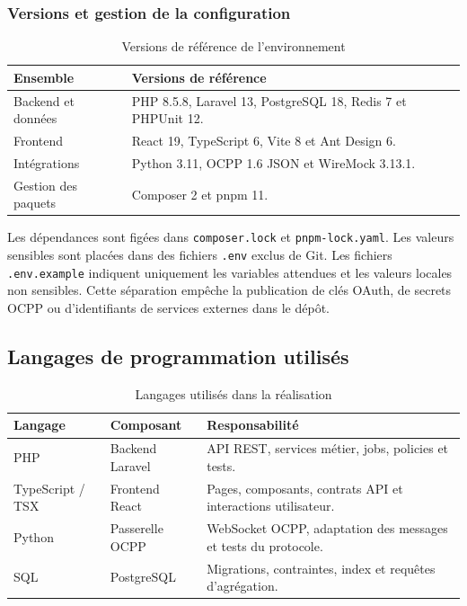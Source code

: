 \subsubsection*{Versions et gestion de la configuration}

\begin{table}[H]
  \centering
  \caption{Versions de référence de l'environnement}
  \label{tab:implementation-toolchain}
  \begin{tabularx}{\textwidth}{|p{3.4cm}|Y|}
    \hline
    \textbf{Ensemble} & \textbf{Versions de référence}\\\hline
    Backend et données &
    PHP 8.5.8, Laravel 13, PostgreSQL 18, Redis 7 et PHPUnit 12.\\\hline
    Frontend &
    React 19, TypeScript 6, Vite 8 et Ant Design 6.\\\hline
    Intégrations &
    Python 3.11, OCPP 1.6 JSON et WireMock 3.13.1.\\\hline
    Gestion des paquets &
    Composer 2 et pnpm 11.\\\hline
  \end{tabularx}
\end{table}

Les dépendances sont figées dans \texttt{composer.lock} et
\texttt{pnpm-lock.yaml}. Les valeurs sensibles sont placées dans des fichiers
\texttt{.env} exclus de Git. Les fichiers \texttt{.env.example} indiquent
uniquement les variables attendues et les valeurs locales non sensibles. Cette
séparation empêche la publication de clés OAuth, de secrets OCPP ou
d'identifiants de services externes dans le dépôt.

\subsection{Langages de programmation utilisés}
\label{sec:implementation-languages}

\begin{table}[H]
  \centering
  \caption{Langages utilisés dans la réalisation}
  \label{tab:implementation-languages}
  \begin{tabularx}{\textwidth}{|p{3.2cm}|p{3.8cm}|Y|}
    \hline
    \textbf{Langage} & \textbf{Composant} & \textbf{Responsabilité}\\\hline
    PHP & Backend Laravel &
    API REST, services métier, jobs, policies et tests.\\\hline
    TypeScript / TSX & Frontend React &
    Pages, composants, contrats API et interactions utilisateur.\\\hline
    Python & Passerelle OCPP &
    WebSocket OCPP, adaptation des messages et tests du protocole.\\\hline
    SQL & PostgreSQL &
    Migrations, contraintes, index et requêtes d'agrégation.\\\hline
  \end{tabularx}
\end{table}

